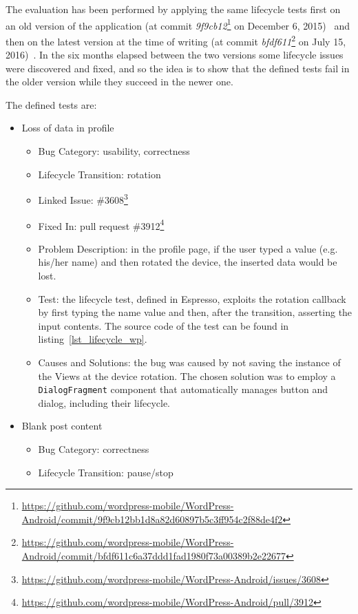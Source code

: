 \documentclass[11pt,a4paper,notitlepage]{article}
\begin{document}
The evaluation has been performed by applying the same lifecycle tests first on an old version of the application (at commit \textit{9f9cb12}\footnote{\url{https://github.com/wordpress-mobile/WordPress-Android/commit/9f9cb12bb1d8a82d60897b5c3ff954c2f88de4f2}} on December 6, 2015)~\cite{WordPress2015-12-06} and then on the latest version at the time of writing (at commit \textit{bfdf611}\footnote{\url{https://github.com/wordpress-mobile/WordPress-Android/commit/bfdf611c6a37ddd1fad1980f73a00389b2e22677}} on July 15, 2016)~\cite{WordPress2016-07-15}. In the six months elapsed between the two versions some lifecycle issues were discovered and fixed, and so the idea is to show that the defined tests fail in the older version while they succeed in the newer one.

The defined tests are:
\begin{itemize}
	\item Loss of data in profile
	\begin{itemize}
		\item Bug Category: usability, correctness
		\item Lifecycle Transition: rotation
		\item Linked Issue: \#3608\footnote{\url{https://github.com/wordpress-mobile/WordPress-Android/issues/3608}}
		\item Fixed In: pull request \#3912\footnote{\url{https://github.com/wordpress-mobile/WordPress-Android/pull/3912}}
		\item Problem Description: in the profile page, if the user typed a value (e.g. his/her name) and then rotated the device, the inserted data would be lost.
		\item Test: the lifecycle test, defined in Espresso, exploits the rotation callback by first typing the name value and then, after the transition, asserting the input contents. The source code of the test can be found in listing~\ref{lst_lifecycle_wp}.
		\item Causes and Solutions: the bug was caused by not saving the instance of the Views at the device rotation. The chosen solution was to employ a \texttt{DialogFragment} component that automatically manages button and dialog, including their lifecycle.
	\end{itemize}
	\item Blank post content
	\begin{itemize}
		\item Bug Category: correctness
		\item Lifecycle Transition: pause/stop

\end{itemize}
\end{itemize}
\end{document}
